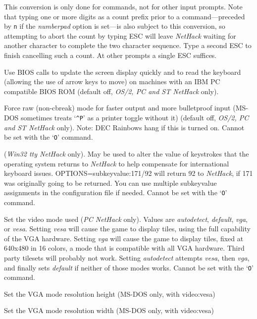 \documentclass[titlepage]{article}
\begin{document}
\begin{description}[font=\mdseries\itshape]
This conversion is only done for commands, not for other input prompts.
Note that typing one or more digits as a count prefix prior to a
command---preceded by \texttt{n} if the \textit{number\textunderscore pad}
option is set---is
also subject to this conversion, so attempting to
abort the count by typing ESC will leave \textit{NetHack} waiting for another
character to complete the two character sequence.
Type a second ESC to finish cancelling such a count.
At other prompts a single ESC suffices.
\item[BIOS]
Use BIOS calls to update the screen display quickly and to read the keyboard
(allowing the use of arrow keys to move) on machines with an IBM PC
compatible BIOS ROM (default off, \textit{OS/2, PC {\rm and} ST NetHack} only).
\item[rawio]
Force raw (non-cbreak) mode for faster output and more
bulletproof input (MS-DOS sometimes treats `\texttt{\textasciicircum P}' as a printer toggle
without it) (default off, \textit{OS/2, PC {\rm and} ST NetHack} only).
Note:  DEC Rainbows hang if this is turned on.
Cannot be set with the `\texttt{O}' command.
\item[subkeyvalue]
(\textit{Win32 tty NetHack } only).
May be used to alter the value of keystrokes that the operating system
returns to \textit{NetHack} to help compensate for international keyboard
issues.
OPTIONS=subkeyvalue:171/92
will return 92 to \textit{NetHack}, if 171 was originally going to be returned.
You can use multiple subkeyvalue assignments in the configuration file
if needed.
Cannot be set with the `\texttt{O}' command.
\item[video]
Set the video mode used (\textit{PC NetHack} only).
Values are \textit{autodetect}, \textit{default}, \textit{vga}, or \textit{vesa}.
Setting \textit{vesa} will cause the game to display tiles, using the full
capability of the VGA hardware.
Setting \textit{vga} will cause the game to display tiles, fixed at 640x480
in 16 colors, a mode that is compatible with all VGA hardware. Third party
tilesets will probably not work.
Setting \textit{autodetect} attempts \textit{vesa}, then \textit{vga}, and
finally sets \textit{default} if neither of those modes works.
Cannot be set with the `\texttt{O}' command.
\item[video\textunderscore height]
Set the VGA mode resolution height (MS-DOS only, with video:vesa)
\item[video\textunderscore width]
Set the VGA mode resolution width (MS-DOS only, with video:vesa)

\end{description}
\end{document}
